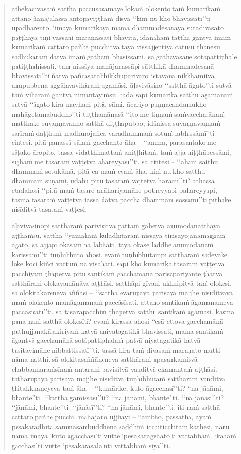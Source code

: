\documentclass[11pt,oneside]{memoir}
\begin{document}
\begin{quote}
athekadivasaṁ satthā paccūsasamaye lokaṁ olokento taṁ kumārikaṁ attano ñāṇajālassa antopaviṭṭhaṁ disvā ‘‘kiṁ nu kho bhavissatī’’ti upadhārento ‘‘imāya kumārikāya mama dhammadesanāya sutadivasato paṭṭhāya tīṇi vassāni maraṇassati bhāvitā, idānāhaṁ tattha gantvā imaṁ kumārikaṁ cattāro pañhe pucchitvā tāya vissajjentiyā catūsu ṭhānesu sādhukāraṁ datvā imaṁ gāthaṁ bhāsissāmi. sā gāthāvasāne sotāpattiphale patiṭṭhahissati, taṁ nissāya mahājanassāpi sātthikā dhammadesanā bhavissatī’’ti ñatvā pañcasatabhikkhuparivāro jetavanā nikkhamitvā anupubbena aggāḷavavihāraṁ agamāsi. āḷavivāsino ‘‘satthā āgato’’ti sutvā taṁ vihāraṁ gantvā nimantayiṁsu. tadā sāpi kumārikā satthu āgamanaṁ sutvā ‘‘āgato kira mayhaṁ pitā, sāmi, ācariyo puṇṇacandamukho mahāgotamabuddho’’ti tuṭṭhamānasā ‘‘ito me tiṇṇaṁ saṁvaccharānaṁ matthake suvaṇṇavaṇṇo satthā diṭṭhapubbo, idānissa suvaṇṇavaṇṇaṁ sarīraṁ daṭṭhuṁ madhurojañca varadhammaṁ sotuṁ labhissāmī’’ti cintesi. pitā panassā sālaṁ gacchanto āha – ‘‘amma, parasantako me sāṭako āropito, tassa vidatthimattaṁ aniṭṭhitaṁ, taṁ ajja niṭṭhāpessāmi, sīghaṁ me tasaraṁ vaṭṭetvā āhareyyāsī’’ti. sā cintesi – ‘‘ahaṁ satthu dhammaṁ sotukāmā, pitā ca maṁ evaṁ āha. kiṁ nu kho satthu dhammaṁ suṇāmi, udāhu pitu tasaraṁ vaṭṭetvā harāmī’’ti? athassā etadahosi ‘‘pitā maṁ tasare anāhariyamāne potheyyapi pahareyyapi, tasmā tasaraṁ vaṭṭetvā tassa datvā pacchā dhammaṁ sossāmī’’ti pīṭhake nisīditvā tasaraṁ vaṭṭesi.

āḷavivāsinopi satthāraṁ parivisitvā pattaṁ gahetvā anumodanatthāya aṭṭhaṁsu. satthā ‘‘yamahaṁ kuladhītaraṁ nissāya tiṁsayojanamaggaṁ āgato, sā ajjāpi okāsaṁ na labhati. tāya okāse laddhe anumodanaṁ karissāmī’’ti tuṇhībhūto ahosi. evaṁ tuṇhībhūtampi satthāraṁ sadevake loke koci kiñci vattuṁ na visahati. sāpi kho kumārikā tasaraṁ vaṭṭetvā pacchiyaṁ ṭhapetvā pitu santikaṁ gacchamānā parisapariyante ṭhatvā satthāraṁ olokayamānāva aṭṭhāsi. satthāpi gīvaṁ ukkhipitvā taṁ olokesi. sā olokitākāreneva aññāsi – ‘‘satthā evarūpāya parisāya majjhe nisīditvāva maṁ olokento mamāgamanaṁ paccāsīsati, attano santikaṁ āgamanameva paccāsīsatī’’ti. sā tasarapacchiṁ ṭhapetvā satthu santikaṁ agamāsi. kasmā pana naṁ satthā olokesīti? evaṁ kirassa ahosi ‘‘esā ettova gacchamānā puthujjanakālakiriyaṁ katvā aniyatagatikā bhavissati, mama santikaṁ āgantvā gacchamānā sotāpattiphalaṁ patvā niyatagatikā hutvā tusitavimāne nibbattissatī’’ti. tassā kira taṁ divasaṁ maraṇato mutti nāma natthi. sā olokitasaññāṇeneva satthāraṁ upasaṅkamitvā chabbaṇṇaraṁsīnaṁ antaraṁ pavisitvā vanditvā ekamantaṁ aṭṭhāsi. tathārūpāya parisāya majjhe nisīditvā tuṇhībhūtaṁ satthāraṁ vanditvā ṭhitakkhaṇeyeva taṁ āha – ‘‘kumārike, kuto āgacchasī’’ti? ‘‘na jānāmi, bhante’’ti. ‘‘kattha gamissasī’’ti? ‘‘na jānāmi, bhante’’ti. ‘‘na jānāsī’’ti? ‘‘jānāmi, bhante’’ti. ‘‘jānāsī’’ti? ‘‘na jānāmi, bhante’’ti. iti naṁ satthā cattāro pañhe pucchi. mahājano ujjhāyi – ‘‘ambho, passatha, ayaṁ pesakāradhītā sammāsambuddhena saddhiṁ icchiticchitaṁ kathesi, nanu nāma imāya ‘kuto āgacchasī’ti vutte ‘pesakāragehato’ti vattabbaṁ. ‘kahaṁ gacchasī’ti vutte ‘pesakārasāla’nti vattabbaṁ siyā’’ti.


\end{quote}
\end{document}
